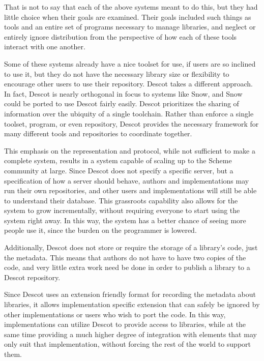 That is not to say that each of the above systems meant to do 
this, but they had little choice when their goals are examined. 
Their goals included such things as tools and an entire 
set of programs necessary to manage libraries, 
and neglect or entirely ignore distribution from the perspective 
of how each of these tools interact with one another. 

Some of these systems already have a nice toolset for use, 
if users are so inclined to use it,
but they do not have the necessary library size 
or flexibility to encourage other users to use their repository.
Descot takes a different approach.
In fact, Descot is nearly orthogonal in focus to systems like 
Snow, and Snow could be ported to use Descot fairly easily.
Descot prioritizes the sharing of information
over the ubiquity of a single toolchain. 
Rather than enforce a single toolset, program, or 
even repository, Descot provides the necessary framework for 
many different tools and repositories to coordinate together. 

This emphasis on the representation and protocol, while 
not sufficient to make a complete system, results in a system 
capable of scaling up to the Scheme community at large. 
Since Descot does not specify a specific server, but a specification 
of how a server should behave,
authors and implementations may run their own repositories, 
and other users and implementations will still be able to understand 
their database.
This grassroots capability also allows for the system to grow 
incrementally, without requiring everyone to start using the 
system right away. In this way, the system has a better chance 
of seeing more people use it, since the burden on the programmer 
is lowered. 

Additionally, Descot does not store or require the storage of 
a library's code, just the metadata. This means that authors 
do not have to have two copies of the code, 
and very little extra work need be done in order to 
publish a library to a Descot repository.

Since Descot uses an extension friendly format 
for recording the metadata about libraries, it allows 
implementation specific extension that can safely be ignored 
by other implementations or users who wish to port the code.
In this way, implementations can 
utilize Descot to provide access to libraries, while at the 
same time providing a much higher degree of integration with 
elements that may only suit that implementation, 
without forcing the rest of the world to support them. 

